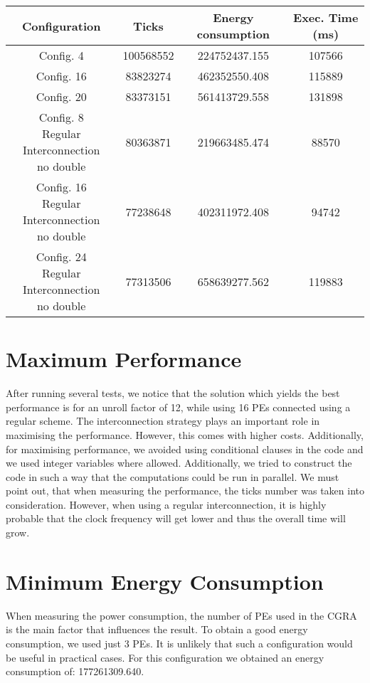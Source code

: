 		\begin{center}
			\begin{tabular}{||c | c c c ||} 
			\hline
			Configuration & Ticks & Energy consumption & Exec. Time (ms)\\ [0.5ex] 
			\hline\hline
			Config.  4 & 100568552 & 224752437.155 & 107566 \\
			\hline
			Config. 16 & 83823274 & 462352550.408 & 115889 \\
			\hline
			Config. 20 & 83373151 & 561413729.558 & 131898 \\
			\hline
			\makecell{Config.  8\\ Regular Interconnection\\ no double} & 80363871 & 219663485.474 & 88570 \\
			\hline
			\makecell{Config. 16\\ Regular Interconnection\\ no double} & 77238648 & 402311972.408 & 94742 \\  
			\hline
			\makecell{Config. 24\\ Regular Interconnection\\ no double} & 77313506 & 658639277.562 & 119883 \\  
			\hline
			\end{tabular}
		\end{center}
  
	\section{Maximum Performance} %
	\label{sec:impl_max_perf}
		After running several tests, we notice that the solution which yields the best performance is for an unroll factor of 12, while using 16 PEs connected using a regular scheme. The interconnection strategy plays an important role in maximising the performance. However, this comes with higher costs. Additionally, for maximising performance, we avoided using conditional clauses in the code and we used integer variables where allowed. Additionally, we tried to construct the code in such a way that the computations could be run in parallel. We must point out, that when measuring the performance, the ticks number was taken into consideration. However, when using a regular interconnection, it is highly probable that the clock frequency will get lower and thus the overall time will grow. 

	\section{Minimum Energy Consumption} %
	\label{sec:impl_min_energy}
		When measuring the power consumption, the number of PEs used in the CGRA is the main factor that influences the result. To obtain a good energy consumption, we used just 3 PEs. It is unlikely that such a configuration would be useful in practical cases. For this configuration we obtained an energy consumption of: 177261309.640.
